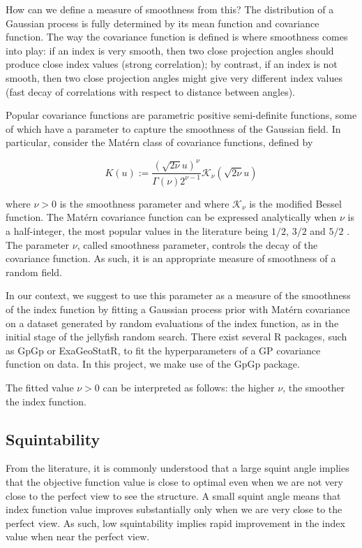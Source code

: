 \documentclass[
  number,
  preprint,
  3p]{elsarticle}
\begin{document}
How can we define a measure of smoothness from this? The distribution of
a Gaussian process is fully determined by its mean function and
covariance function. The way the covariance function is defined is where
smoothness comes into play: if an index is very smooth, then two close
projection angles should produce close index values (strong
correlation); by contrast, if an index is not smooth, then two close
projection angles might give very different index values (fast decay of
correlations with respect to distance between angles).

Popular covariance functions are parametric positive semi-definite
functions, some of which have a parameter to capture the smoothness of
the Gaussian field. In particular, consider the Matérn class of
covariance functions, defined by

\[
K(u):=\frac{(\sqrt{2\nu}u)^{\nu}}{\Gamma(\nu)2^{\nu-1}}\mathcal{K}_{\nu}(\sqrt{2\nu}u)
\]

where \(\nu>0\) is the smoothness parameter and where
\(\mathcal{K}_\nu\) is the modified Bessel function. The Matérn
covariance function can be expressed analytically when \(\nu\) is a
half-integer, the most popular values in the literature being \(1/2\),
\(3/2\) and \(5/2\) . The parameter \(\nu\), called smoothness
parameter, controls the decay of the covariance function. As such, it is
an appropriate measure of smoothness of a random field.

In our context, we suggest to use this parameter as a measure of the
smoothness of the index function by fitting a Gaussian process prior
with Matérn covariance on a dataset generated by random evaluations of
the index function, as in the initial stage of the jellyfish random
search. There exist several R packages, such as GpGp or ExaGeoStatR, to
fit the hyperparameters of a GP covariance function on data. In this
project, we make use of the GpGp package.

The fitted value \(\nu>0\) can be interpreted as follows: the higher
\(\nu\), the smoother the index function.

\subsection{Squintability}\label{sec-squintability}

From the literature, it is commonly understood that a large squint angle
implies that the objective function value is close to optimal even when
we are not very close to the perfect view to see the structure. A small
squint angle means that index function value improves substantially only
when we are very close to the perfect view. As such, low squintability
implies rapid improvement in the index value when near the perfect view.
\end{document}
